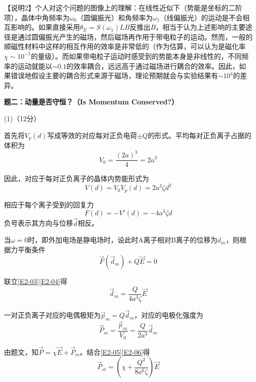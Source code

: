 \documentclass[10pt,a4paper,onecolumn,UTF8]{ctexart}
\begin{document}
	【说明2】个人对这个问题的图像上的理解：在线性近似下（势能是坐标的二阶项），晶体中角频率为$\omega_0$（圆偏振光）和角频率为$\omega_1$（线偏振光）的运动是不会相互影响的。如果直接采用$\theta_E=S(\omega_1)LB$反推出$B$，相当于认为上述影响的主要途径是通过圆偏振光产生的磁场，然后磁场再作用于带电粒子的运动。然而，一般的顺磁性材料中这样的相互作用的效率是非常低的（作为估算，可以认为是磁化率$\chi\sim10^{-5}$的量级）。而如果带电粒子运动时感受到的势能本身是非线性的，不同频率的运动就能以$\sim0.1$的效率耦合，远远高于通过磁场进行耦合的效率。因此，如果错误地假设主要的耦合形式来源于磁场，理论预期就会与实验结果有$\sim10^4$的差异。
	
	\setcounter{equation}{0}
	
	\newpage
	
	\noindent
	\textbf{题二：动量是否守恒？（Is Momentum Conserved?）}
	
	(1)（12分）
	
	首先将$V_p(d)$写成等效的对应每对正负电荷$\pm Q$的形式。平均每对正负离子占据的体积为
	\begin{equation}\label{E2-01}
		V_0=\frac{(2a)^3}{4}=2a^3
	\end{equation}
	
	因此，对应于每对正负离子的晶体内势能形式为
	\begin{equation}\label{E2-02}
		V(d)=V_0V_p(d)=2a^3\zeta d^2
	\end{equation}
	
	相应于每个离子受到的回复力
	\begin{equation}\label{E2-03}
		F(d)=-V'(d)=-4a^3\zeta d
	\end{equation}
	负号表示其方向与位移$\vec d$相反。
	
	当$\omega=0$时，即外加电场是静电场时，设此时A离子相对B离子的位移为$d_m$，则根据力平衡条件
	\begin{equation}\label{E2-04}
		\vec F(\vec d_m)+Q\vec E=0
	\end{equation}
	
	联立\eqref{E2-03}\eqref{E2-04}得
	\begin{equation}\label{E2-05}
		\vec{d}_m=\frac{Q}{4a^3\zeta}\vec E
	\end{equation}
	
	一对正负离子对应的电偶极矩为$\vec p_m=Q\vec{d}_m$，对应的电极化强度为
	\begin{equation}\label{E2-06}
		\vec P_m=\frac{\vec p_m}{V_0}=\frac{Q}{2a^3}\vec d_m
	\end{equation}
	
	由题文，知$\vec{P}=\chi\vec E+\vec P_m$。结合\eqref{E2-05}\eqref{E2-06}得
	\begin{equation}\label{E2-07}
		\vec{P}_{st}=\left(\chi+\frac{Q^2}{8a^6\zeta}\right)\vec E
	\end{equation}
	
\end{document}

